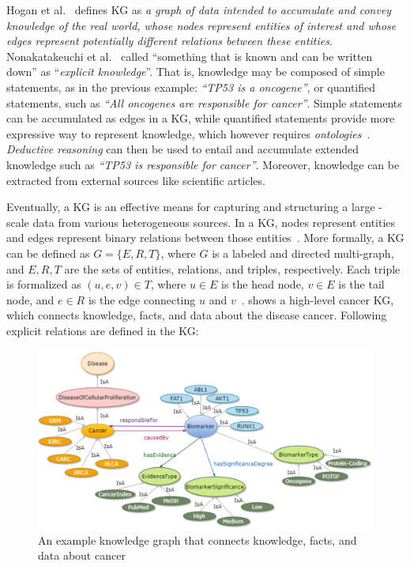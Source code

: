 \hspace*{3.5mm} Hogan et al.~\cite{hogan2020knowledge} defines KG as \textit{a graph of data intended to accumulate and convey knowledge of the real world, whose nodes represent entities of interest and whose edges represent potentially different relations between these entities}. Nonakatakeuchi et al.~\cite{nonakatakeuchi1995} called ``something that is known and can be written down'' as ``\textit{explicit knowledge}''. That is, knowledge may be composed of simple statements, as in the previous example: \textit{``TP53 is a oncogene''}, or quantified statements, such as \textit{``All oncogenes are responsible for cancer''}. Simple statements can be accumulated as edges in a KG, while quantified statements provide more expressive way to represent knowledge, which however requires \textit{ontologies}~\cite{hogan2020knowledge}. \textit{Deductive reasoning} can then be used to entail and accumulate extended knowledge such as \textit{``TP53 is responsible for cancer''}. Moreover, knowledge can be extracted from external sources like scientific articles. 

\hspace*{3.5mm} Eventually, a KG is an effective means for capturing and structuring a large -scale data from various heterogeneous sources. In a KG, nodes represent entities and edges represent binary relations between those entities~\cite{hogan2020knowledge}. More formally, a KG can be defined as $G=\{E,R,T\}$, where $G$ is a labeled and directed multi-graph, and $E, R, T$ are the sets of entities, relations, and triples, respectively. Each triple is formalized as $(u,e,v) \in T$, where $u \in E$ is the head node, $v \in E$ is the tail node, and $e \in R$ is the edge connecting $u$ and $v$~\cite{hogan2020knowledge}.  shows a high-level cancer KG, which connects knowledge, facts, and data about the disease cancer. Following explicit relations are defined in the KG: 

\begin{figure}[h]
	\centering
	\includegraphics[scale=0.65]{images/cancer_ontology_example.png}
	\caption{An example knowledge graph that connects knowledge, facts, and data about cancer} 
	\label{fig:cancer_ontology_example}
	\vspace{-2mm}
\end{figure}

